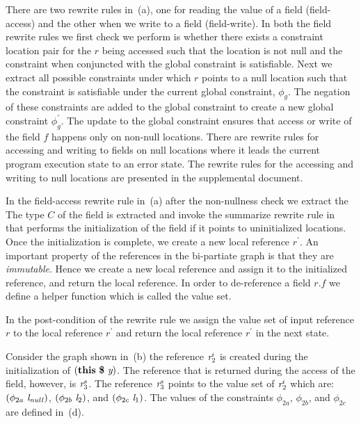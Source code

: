 There are two rewrite rules in~(a), one for reading
the value of a field (field-access) and the other when we write to a
field (field-write). In both the field rewrite rules we first check we
perform is whether there exists a constraint location pair for the $r$
being accessed such that the location is not null and the constraint
when conjuncted with the global constraint is satisfiable. Next we
extract all possible constraints under which $r$ points to a null
location such that the constraint is satisfiable under the current
global constraint, $\phi_g$. The negation of these constraints are
added to the global constraint to create a new global constraint
$\phi_g^\prime$. The update to the global constraint ensures that
access or write of the field $f$ happens only on non-null
locations. There are rewrite rules for accessing and writing to fields
on null locations where it leads the current program execution state
to an error state. The rewrite rules for the accessing and writing to
null locations are presented in the supplemental document.

In the field-access rewrite rule in~(a) after the
non-nullness check we extract the The type $C$ of the field is
extracted and invoke the summarize rewrite rule
in~ that performs the initialization of the field
if it points to uninitialized locations. Once the initialization is
complete, we create a new local reference $r^\prime$. An important
property of the references in the bi-partiate graph is that they are
\emph{immutable}. Hence we create a new local reference and assign it
to the initialized reference, and return the local reference. In order
to de-reference a field $r.f$ we define a helper function which is
called the value set.



In the post-condition of the rewrite rule we assign
the value set of input reference $r$ to the local reference $r^\prime$
and return the local reference $r^\prime$ in the next state.

Consider the graph shown in~(b) the reference
$\emph{r}_2^i$ is created during the initialization of $\lp\cfgt{this}\  \cfgt{\$}\ \cfgnt{y}\rp$. The
reference that is returned during the access of the field, however, is
$\emph{r}_3^s$. The reference $\emph{r}_3^s$ points to the value set of $\emph{r}_2^i$
which are: $(\phi_{2a}\ \emph{l}_\mathit{null})$, $(\phi_{2b}\ \emph{l}_2)$, and
$(\phi_{2c}\ \emph{l}_1)$. The values of the constraints $\phi_{2a}$,
$\phi_{2b}$, and $\phi_{2c}$ are defined in~(d).

